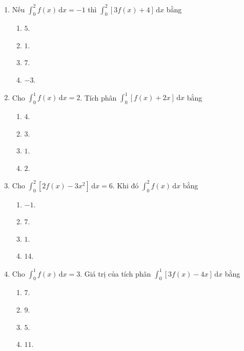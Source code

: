 \documentclass[12pt]{article}
\begin{document}
\begin{enumerate}[label=\textbf{Câu \arabic*.}]
		\item Nếu $\displaystyle \int_0^2 f(x)\,\mathrm{d}x = -1$ thì $\displaystyle \int_0^2 [3f(x) + 4]\,\mathrm{d}x$ bằng
		\begin{multicols}{4}
			\begin{enumerate}[label=\textbf{\Alph*.}]
				\item $5$.
				\item $1$.
				\item $7$.
				\item $-3$.
			\end{enumerate}
		\end{multicols}
		
		\item Cho $\displaystyle \int_0^1 f(x)\,\mathrm{d}x = 2$. Tích phân $\displaystyle \int_0^1 [f(x) + 2x]\,\mathrm{d}x$ bằng
		\begin{multicols}{4}
			\begin{enumerate}[label=\textbf{\Alph*.}]
				\item $4$.
				\item $3$.
				\item $1$.
				\item $2$.
			\end{enumerate}
		\end{multicols}
		
		\item Cho $\displaystyle \int_0^2 [2f(x) - 3x^2]\,\mathrm{d}x = 6$. Khi đó $\displaystyle \int_0^2 f(x)\,\mathrm{d}x$ bằng
		\begin{multicols}{4}
			\begin{enumerate}[label=\textbf{\Alph*.}]
				\item $-1$.
				\item $7$.
				\item $1$.
				\item $14$.
			\end{enumerate}
		\end{multicols}
		
		\item Cho $\displaystyle \int_0^1 f(x)\,\mathrm{d}x = 3$. Giá trị của tích phân $\displaystyle \int_0^1 [3f(x) - 4x]\,\mathrm{d}x$ bằng
		\begin{multicols}{4}
			\begin{enumerate}[label=\textbf{\Alph*.}]
				\item $7$.
				\item $9$.
				\item $5$.
				\item $11$.
			\end{enumerate}
		\end{multicols}
		

\end{enumerate}
\end{document}

